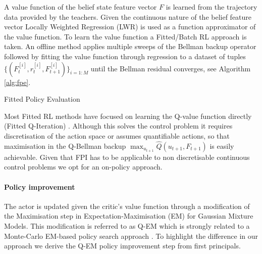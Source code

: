 \documentclass[final,5p,times,twocolumn]{elsarticle}
\makeatletter
\newcommand{\removelatexerror}{\let\@latex@error\@gobble}
\makeatother
\begin{document}
A value function of the belief state feature vector $F$ is  learned from the 
trajectory data provided by the teachers. Given the continuous nature of the belief feature vector Locally Weighted Regression
(LWR) \cite{Atkeson97locallyweighted}  is used as a function approximator of the value function.
To learn the value function a Fitted/Batch RL approach is taken\cite{EGW05}.  An offline method applies multiple 
sweeps of the Bellman backup operator followed by fitting the value function through regression to a dataset of 
tuples $\{(F^{[i]}_t,r^{[i]}_t,F^{[i]}_{t+1})\}_{i=1:M}$ until the Bellman residual 
converges, see Algorithm \ref{alg:fpe}.

\begin{center}
\begin{minipage}{\linewidth}
\removelatexerror%
\begin{algorithm*}[H]
\label{alg:fpe}
\BlankLine
{}
\caption{Fitted Policy Evaluation}
\end{algorithm*} 
\end{minipage}
\end{center}

Most Fitted RL methods have focused on learning the Q-value function directly (Fitted Q-Iteration) 
\cite{NIPS2008_3501,EGW05,Riedmiller2005}. Although this solves the control problem it requires discretisation 
of the action space or assumes quantifiable actions, so that maximisation in the Q-Bellman backup
${\max_{u_{t+1}} \hat{Q}(u_{t+1},F_{t+1})}$ is easily achievable. Given that FPI has to be applicable to 
non discretisable continuous control problems we opt for an on-policy approach.

\paragraph{Policy improvement}

The actor is updated given the critic's value function through a modification of the Maximisation step in  Expectation-Maximisation (EM) 
for Gaussian Mixture Models. This modification is referred to as Q-EM which is strongly related to a Monte-Carlo EM-based policy 
search approach \cite[p.50]{p_search_surv_2011}. To highlight the difference in our approach we derive the Q-EM policy improvement step
from first principals.
\end{document}
